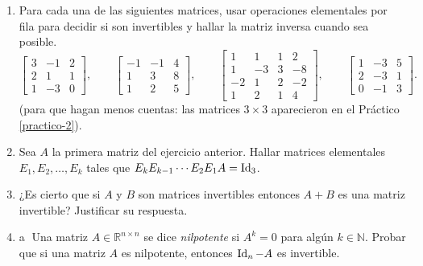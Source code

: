 \begin{enumerate}[topsep=6pt,itemsep=.4cm]


\item\label{ej:inversas} Para cada una de las siguientes matrices, usar operaciones elementales
por fila para decidir si son invertibles y hallar la matriz inversa cuando sea posible.
\begin{equation*}
\begin{bmatrix} 3 & -1 & 2 \\ 2 & 1 & 1 \\ 1 & -3 & 0\end{bmatrix},\qquad
\begin{bmatrix} -1 & -1 &4 \\ 1 & 3 & 8 \\ 1 & 2 & 5\end{bmatrix},\qquad
\begin{bmatrix} 1 & 1 & 1 & 2 \\ 1 & -3 & 3 & -8 \\ -2 & 1 & 2 & -2 \\ 1 & 2 & 1 & 4 \end{bmatrix},\qquad
\begin{bmatrix} 1 & -3 & 5 \\ 2 & -3 & 1 \\ 0 & -1 & 3 \end{bmatrix}.
\end{equation*}
(para que hagan menos cuentas: las matrices $3\times3$ aparecieron en el Práctico \ref{practico-2}).


\item Sea $A$ la primera matriz del ejercicio anterior.
Hallar matrices elementales $E_1,E_2,\dots,E_k$ tales que $E_kE_{k-1}\cdots E_2E_1A=\operatorname{Id}_3$.


\item\label{suma-de-invertibles} ¿Es cierto que si $A$ y $B$ son matrices invertibles entonces $A+B$ es una matriz invertible? Justificar su respuesta.

\item\label{nilpotene - id} \textcircled{a} Una matriz $A\in\mathbb{R}^{n\times n}$ se dice \emph{nilpotente} si $A^k=0$ para algún $k\in\mathbb{N}$.
Probar que si una matriz $A$ es nilpotente, entonces  $\operatorname{Id}_n - A$  es invertible.



\end{enumerate}
